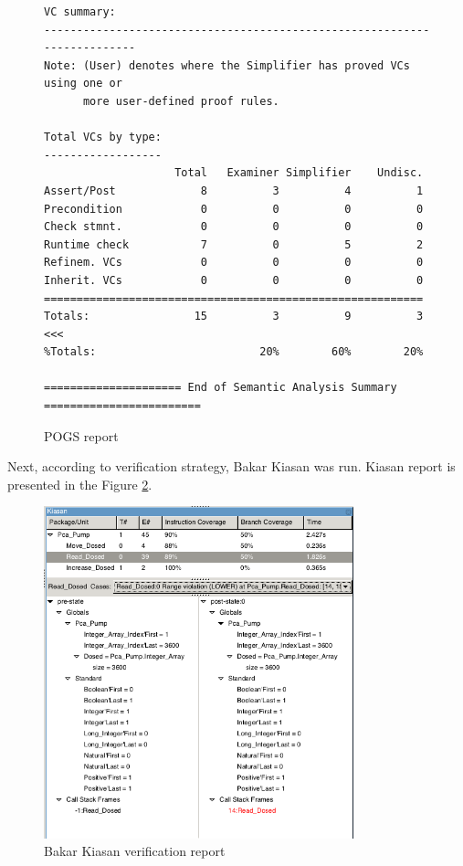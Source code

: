 \begin{figure}
\begin{lstlisting}[frame=single, gobble=0]
VC summary:
-------------------------------------------------------------------------
Note: (User) denotes where the Simplifier has proved VCs using one or
      more user-defined proof rules.

Total VCs by type:
------------------
                    Total   Examiner Simplifier    Undisc.
Assert/Post             8          3          4          1
Precondition            0          0          0          0
Check stmnt.            0          0          0          0
Runtime check           7          0          5          2
Refinem. VCs            0          0          0          0
Inherit. VCs            0          0          0          0
==========================================================
Totals:                15          3          9          3 <<<
%Totals:                         20%        60%        20%

===================== End of Semantic Analysis Summary ========================
\end{lstlisting}
\doublespacing
\caption{POGS report}
\label{listing:pcapump_dosemonitor_pogs}
\end{figure}

Next, according to verification strategy, Bakar Kiasan was run. Kiasan report is presented in the Figure \ref{figure:sparkverification:kiasanreport1}.

\begin{figure}[ht]%
    \begin{center}
        \includegraphics[width=0.8\textwidth]{figures/pca-pump-verification-step1.png}        
    \end{center}    
    \caption{Bakar Kiasan verification report}
    \label{figure:sparkverification:kiasanreport1}
\end{figure}

